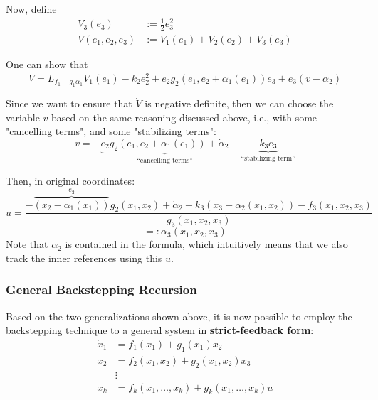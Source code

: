 Now, define
\begin{align*}
    V_3(e_3)         & := \frac{1}{2}e_3^2               \\
    V(e_1, e_2, e_3) & := V_1(e_1) + V_2(e_2) + V_3(e_3)
\end{align*}

One can show that
\begin{equation*}
    \dot{V} = L_{f_1 + g_1\alpha_1}V_1(e_1) - k_2e_2^2 + e_2g_2(e_1, e_2 + \alpha_1(e_1))e_3 + e_3(v - \dot{\alpha}_2)
\end{equation*}

Since we want to ensure that $\dot{V}$ is negative definite, then we can choose the variable $v$ based on the same reasoning discussed above, i.e., with some "cancelling terms", and some "stabilizing terms":
\begin{equation*}
    v = -\underbrace{e_2g_2(e_1, e_2 + \alpha_1(e_1)) + \dot{\alpha}_2}_{\text{``cancelling terms''}} - \underbrace{k_3e_3}_{\text{``stabilizing term''}}
\end{equation*}
\newpar{}

Then, in original coordinates:
{\tiny
\begin{equation*}
    u  = \frac{- \overbrace{(x_2 - \alpha_1(x_1))}^{e_2}g_2(x_1, x_2) + \dot{\alpha}_2 - k_3(x_3 - \alpha_2(x_1, x_2)) - f_3(x_1, x_2, x_3)}{g_3(x_1, x_2, x_3)}
\end{equation*}
}
\begin{equation*}
    =: \alpha_3(x_1, x_2, x_3)
\end{equation*}
Note that $\alpha_2$ is contained in the formula, which intuitively means that we also track the inner references using this $u$.
\subsubsection{General Backstepping Recursion}\label{general_backstepping}

Based on the two generalizations shown above, it is now possible to employ the backstepping technique to a general system in \textbf{strict-feedback form}:
\begin{align*}
    \dot{x}_1 & = f_1(x_1) + g_1(x_1)x_2                         \\
    \dot{x}_2 & = f_2(x_1, x_2) + g_2(x_1, x_2)x_3               \\
              & \vdots                                           \\
    \dot{x}_k & = f_k(x_1, \ldots, x_k) + g_k(x_1, \ldots, x_k)u
\end{align*}

